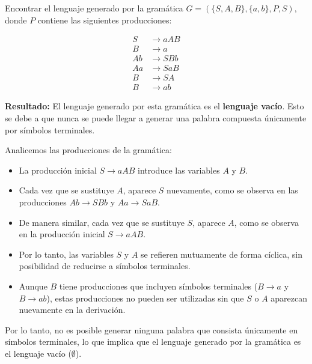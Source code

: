 \documentclass[12pt]{book} %
\begin{document}
\begin{ejercicioresuelto}
Encontrar el lenguaje generado por la gramática \( G = (\{S, A, B\}, \{a, b\}, P, S) \), donde \( P \) contiene las siguientes producciones:

\[
\begin{aligned}
    S &\to aAB \\
    B &\to a \\
    Ab &\to SBb \\
    Aa &\to SaB \\
    B &\to SA \\
    B &\to ab
\end{aligned}
\]

\textbf{Resultado:} El lenguaje generado por esta gramática es el \textbf{lenguaje vacío}. Esto se debe a que nunca se puede llegar a generar una palabra compuesta únicamente por símbolos terminales. 

\begin{demostracion}
Analicemos las producciones de la gramática:


\begin{itemize}
    \item La producción inicial \( S \to aAB \) introduce las variables \( A \) y \( B \).
    \item Cada vez que se sustituye \( A \), aparece \( S \) nuevamente, como se observa en las producciones \( Ab \to SBb \) y \( Aa \to SaB \).
    \item De manera similar, cada vez que se sustituye \( S \), aparece \( A \), como se observa en la producción inicial \( S \to aAB \).
    \item Por lo tanto, las variables \( S \) y \( A \) se refieren mutuamente de forma cíclica, sin posibilidad de reducirse a símbolos terminales.
    \item Aunque \( B \) tiene producciones que incluyen símbolos terminales (\( B \to a \) y \( B \to ab \)), estas producciones no pueden ser utilizadas sin que \( S \) o \( A \) aparezcan nuevamente en la derivación.
\end{itemize}

Por lo tanto, no es posible generar ninguna palabra que consista únicamente en símbolos terminales, lo que implica que el lenguaje generado por la gramática es el lenguaje vacío (\( \emptyset \)).
\end{demostracion}
\end{ejercicioresuelto}
\end{document}

